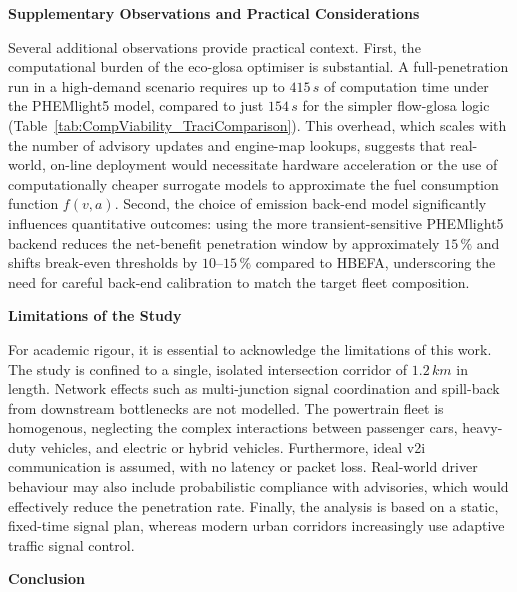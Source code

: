 \bigskip
\textbf{Supplementary Observations and Practical Considerations}

Several additional observations provide practical context. First, the computational burden of the \ac{eco-glosa} optimiser is substantial. A full-penetration run in a high-demand scenario requires up to $415\,\unit{s}$ of computation time under the PHEMlight5 model, compared to just $154\,\unit{s}$ for the simpler \ac{flow-glosa} logic (Table~\ref{tab:CompViability_TraciComparison}). This overhead, which scales with the number of advisory updates and engine-map lookups, suggests that real-world, on-line deployment would necessitate hardware acceleration or the use of computationally cheaper surrogate models to approximate the fuel consumption function $f(v,a)$.
\mynewline
Second, the choice of emission back-end model significantly influences quantitative outcomes: using the more transient-sensitive PHEMlight5 backend reduces the net-benefit penetration window by approximately $15\,\%$ and shifts break-even thresholds by $10$–$15\,\%$ compared to HBEFA, underscoring the need for careful back-end calibration to match the target fleet composition.  

\bigskip
\textbf{Limitations of the Study}

For academic rigour, it is essential to acknowledge the limitations of this work. The study is confined to a single, isolated intersection corridor of $1.2\,\unit{km}$ in length. Network effects such as multi-junction signal coordination and spill-back from downstream bottlenecks are not modelled. The powertrain fleet is homogenous, neglecting the complex interactions between passenger cars, heavy-duty vehicles, and electric or hybrid vehicles. Furthermore, ideal \ac{v2i} communication is assumed, with no latency or packet loss. Real-world driver behaviour may also include probabilistic compliance with advisories, which would effectively reduce the penetration rate. Finally, the analysis is based on a static, fixed-time signal plan, whereas modern urban corridors increasingly use adaptive traffic signal control.

\bigskip
\textbf{Conclusion}


